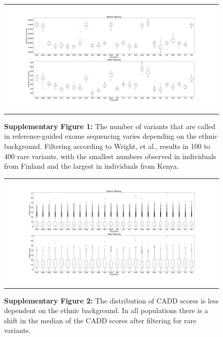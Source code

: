 \documentclass[11pt]{article}
\begin{document}
\begin{figure}[ht]
  \begin{center}
    \graphicspath{{./figures/}}
    \begin{tabular}{c}
      \includegraphics[width=18 cm, height= 9 cm]{population_variants_num.png}
    \end{tabular}
  \caption*{\textbf{Supplementary Figure 1:} The number of variants that are called in reference-guided exome sequencing varies depending on the ethnic background. Filtering according to Wright, et al., results in 100 to 400 rare variants, with the smallest numbers observed in individuals from Finland and the largest in individuals from Kenya.}
  \end{center}
\end{figure}

\begin{figure}[ht]
  \begin{center}
    \graphicspath{{./figures/}}
    \begin{tabular}{c}
      \includegraphics[width=18 cm, height= 9 cm]{population_cadd.png}
    \end{tabular}
  \caption*{\textbf{Supplementary Figure 2:} The distribution of CADD scores is less dependent on the ethnic background. In all populations there is a shift in the median of the CADD scores after filtering for rare variants.}
  \end{center}
\end{figure}
\end{document}
